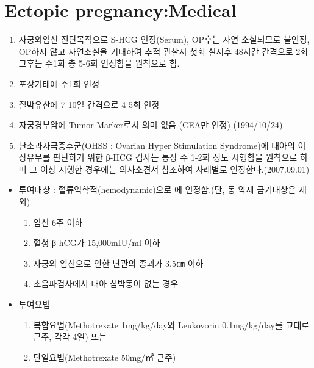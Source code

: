 \section{Ectopic pregnancy:Medical}
%
{\begin{enumerate}[(1)]\tightlist
\item 자궁외임신 진단목적으로 S-HCG 인정(Serum), OP후는 자연 소실되므로 불인정, OP하지 않고 자연소실을 기대하여 추적 관찰시 첫회 실시후
     48시간 간격으로 2회 그후는 주1회 총 5-6회 인정함을 원칙으로 함.
\item 포상기태에 주1회 인정
\item 절박유산에 7-10일 간격으로 4-5회 인정
\item 자궁경부암에 Tumor Marker로서 의미 없음 (CEA만 인정) (1994/10/24)
\item 난소과자극증후군(OHSS : Ovarian Hyper Stimulation Syndrome)에 태아의 이상유무를 판단하기 위한 β-HCG 검사는 통상 주 1-2회 정도 시행함을 원칙으로 하며 그 이상 시행한 경우에는 의사소견서 참조하여 사례별로 인정한다.(2007.09.01)
\end{enumerate}
\begin{itemize}[○]\tightlist
\item 투여대상 : 혈류역학적(hemodynamic)으로 에 인정함.(단, 동 약제 금기대상은 제외)
	\begin{enumerate}[①]\tightlist
	\item 임신 6주 이하
	\item 혈청 β-hCG가 15,000mIU/ml 이하
	\item 자궁외 임신으로 인한 난관의 종괴가 3.5㎝ 이하 
	\item 초음파검사에서 태아 심박동이 없는 경우
	\end{enumerate}
\item 투여요법  
	\begin{enumerate}[①]\tightlist
	\item 복합요법(Methotrexate 1mg/kg/day와 Leukovorin 0.1mg/kg/day를 교대로 근주, 각각 4일) 또는 
	\item 단일요법(Methotrexate 50mg/㎡ 근주)
	\end{enumerate}
\end{itemize}
}

